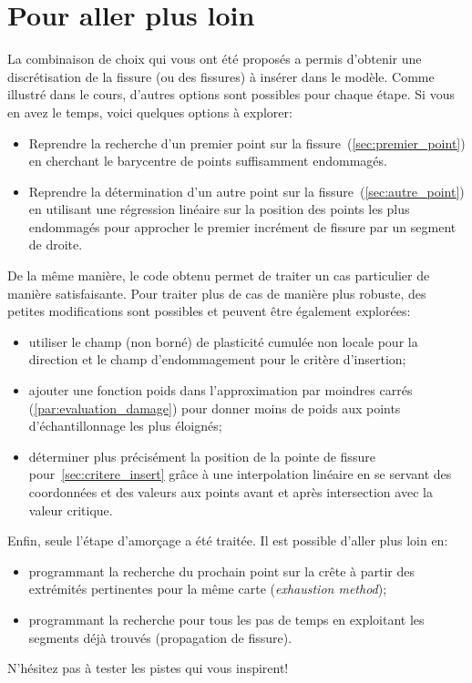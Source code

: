 \documentclass[french,12pt]{exam}
\begin{document}
\section{Pour aller plus loin}
La combinaison de choix qui vous ont été proposés a permis d'obtenir une discrétisation de la fissure (ou des fissures) à insérer dans le modèle. Comme illustré dans le cours, d'autres options sont possibles pour chaque étape. Si vous en avez le temps, voici quelques options à explorer:
\begin{itemize}
\item Reprendre la recherche d'un premier point sur la fissure~(\ref{sec:premier_point}) en cherchant le barycentre de points suffisamment endommagés. 
\item Reprendre la détermination d'un autre point sur la fissure~(\ref{sec:autre_point}) en utilisant une régression linéaire sur la position des points les plus endommagés pour approcher le premier incrément de fissure par un segment de droite. 
\end{itemize} 
De la même manière, le code obtenu permet de traiter un cas particulier de manière satisfaisante. Pour traiter plus de cas de manière plus robuste, des petites modifications sont possibles et peuvent être également explorées:
\begin{itemize}
\item utiliser le champ (non borné) de plasticité cumulée non locale pour la direction et le champ d'endommagement pour le critère d'insertion;
\item ajouter une fonction poids dans l'approximation par moindres carrés (\ref{par:evaluation_damage}) pour donner moins de poids aux points d'échantillonnage les plus éloignés;
\item déterminer plus précisément la position de la pointe de fissure pour~\ref{sec:critere_insert} grâce à une interpolation linéaire en se servant des coordonnées et des valeurs aux points avant et après intersection avec la valeur critique.
\end{itemize}
Enfin, seule l'étape d'amorçage a été traitée. Il est possible d'aller plus loin en:
\begin{itemize}
\item programmant la recherche du prochain point sur la crête à partir des extrémités pertinentes pour la même carte (\emph{exhaustion method});
\item programmant la recherche pour tous les pas de temps en exploitant les segments déjà trouvés (propagation de fissure).
\end{itemize}
N'hésitez pas à tester les pistes qui vous inspirent!
\end{document}
